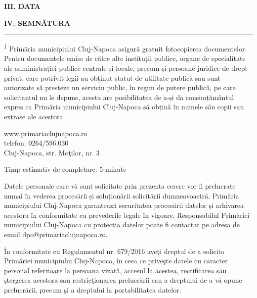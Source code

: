 \documentclass[11pt,a4paper]{article}
\begin{document}
\vspace{0.6cm}

\textbf{III. DATA}\\
\hrulefill

\vspace{0.6cm}

\textbf{IV. SEMNĂTURA}\\
\hrulefill

\vspace{1cm}

\hrule

\vspace{0.3cm}

\footnotesize
\textsuperscript{1} Primăria municipiului Cluj-Napoca asigură gratuit fotocopierea documentelor.\\
Pentru documentele emise de către alte instituții publice, organe de specialitate ale administrației publice centrale și locale, precum și persoane juridice de drept privat, care potrivit legii au obținut statut de utilitate publică sau sunt autorizate să presteze un serviciu public, în regim de putere publică, pe care solicitantul nu le depune, acesta are posibilitatea de a-și da consimțământul expres ca Primăria municipiului Cluj-Napoca să obțină în numele său copii sau extrase ale acestora.

\vspace{0.4cm}

www.primariaclujnapoca.ro\\
telefon: 0264/596.030\\
Cluj-Napoca, str. Moţilor, nr. 3

\vspace{0.3cm}

Timp estimativ de completare: 5 minute

\vspace{0.2cm}

Datele personale care vă sunt solicitate prin prezenta cerere vor fi prelucrate numai în vederea procesării și soluționării solicitării dumneavoastră. Primăria municipiului Cluj-Napoca garantează securitatea procesării datelor și arhivarea acestora în conformitate cu prevederile legale în vigoare. Responsabilul Primăriei municipiului Cluj-Napoca cu protecția datelor poate fi contactat pe adresa de email dpo@primariaclujnapoca.ro.

În conformitate cu Regulamentul nr. 679/2016 aveți dreptul de a solicita Primăriei municipiului Cluj-Napoca, în ceea ce priveşte datele cu caracter personal referitoare la persoana vizată, accesul la acestea, rectificarea sau ştergerea acestora sau restricţionarea prelucrării sau a dreptului de a vă opune prelucrării, precum şi a dreptului la portabilitatea datelor.
\end{document}
